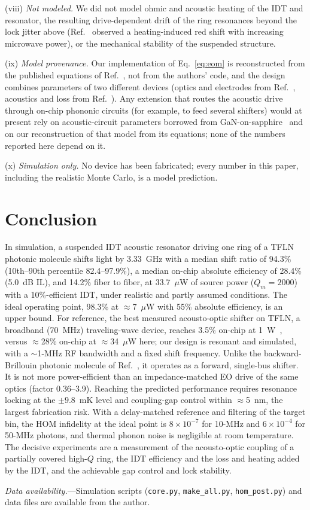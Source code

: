 \documentclass[aps,prapplied,reprint,superscriptaddress,amsmath,amssymb,floatfix]{revtex4-2}
\begin{document}
(viii) \emph{Not modeled.} We did not model ohmic and acoustic heating of the IDT and resonator, the resulting drive-dependent drift of the ring resonances beyond the lock jitter above (Ref.~\cite{Shao2019} observed a heating-induced red shift with increasing microwave power), or the mechanical stability of the suspended structure.

(ix) \emph{Model provenance.} Our implementation of Eq.~\eqref{eq:eom} is reconstructed from the published equations of Ref.~\cite{Hu2021}, not from the authors' code, and the design combines parameters of two different devices (optics and electrodes from Ref.~\cite{Hu2021}, acoustics and loss from Ref.~\cite{Shao2019}). Any extension that routes the acoustic drive through on-chip phononic circuits (for example, to feed several shifters) would at present rely on acoustic-circuit parameters borrowed from GaN-on-sapphire~\cite{Xu2025} and on our reconstruction of that model from its equations; none of the numbers reported here depend on it.

(x) \emph{Simulation only.} No device has been fabricated; every number in this paper, including the realistic Monte Carlo, is a model prediction.

\section{Conclusion}
In simulation, a suspended IDT acoustic resonator driving one ring of a TFLN photonic molecule shifts light by 3.33~GHz with a median shift ratio of 94.3\% (10th--90th percentile 82.4--97.9\%), a median on-chip absolute efficiency of 28.4\% (5.0~dB IL), and 14.2\% fiber to fiber, at 33.7~$\mu$W of source power ($Q_m=2000$) with a 10\%-efficient IDT, under realistic and partly assumed conditions. The ideal operating point, 98.3\% at $\approx$7~$\mu$W with 55\% absolute efficiency, is an upper bound. For reference, the best measured acousto-optic shifter on TFLN, a broadband (70~MHz) traveling-wave device, reaches 3.5\% on-chip at 1~W~\cite{Shao2020}, versus $\approx$28\% on-chip at $\approx$34~$\mu$W here; our design is resonant and simulated, with a $\sim$1-MHz RF bandwidth and a fixed shift frequency. Unlike the backward-Brillouin photonic molecule of Ref.~\cite{Zhu2025ao}, it operates as a forward, single-bus shifter. It is not more power-efficient than an impedance-matched EO drive of the same optics (factor 0.36--3.9). Reaching the predicted performance requires resonance locking at the $\pm9.8$~mK level and coupling-gap control within $\approx$5~nm, the largest fabrication risk. With a delay-matched reference and filtering of the target bin, the HOM infidelity at the ideal point is $8\times10^{-7}$ for 10-MHz and $6\times10^{-4}$ for 50-MHz photons, and thermal phonon noise is negligible at room temperature. The decisive experiments are a measurement of the acousto-optic coupling of a partially covered high-$Q$ ring, the IDT efficiency and the loss and heating added by the IDT, and the achievable gap control and lock stability.

\emph{Data availability.}---Simulation scripts (\texttt{core.py}, \texttt{make\_all.py}, \texttt{hom\_post.py}) and data files are available from the author.


\end{document}
